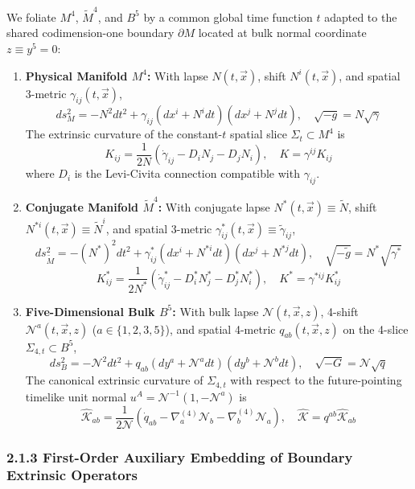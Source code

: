 \documentclass[aps,prd,onecolumn,superscriptaddress,nofootinbib,longbibliography,10pt]{revtex4-2}
\begin{document}
{{  We foliate \(M^4\), \(\tilde{M}^4\), and \(B^5\) by a common global time function \(t\) adapted to the shared codimension-one boundary \(\partial M\) located at bulk normal coordinate \(z \equiv y^5 = 0\):


  
\begin{enumerate}
    
\item \textbf{Physical Manifold \(M^4\):} With lapse \(N(t,\vec{x})\), shift \(N^i(t,\vec{x})\), and spatial 3-metric \(\gamma_{ij}(t,\vec{x})\),
    \[ ds_M^2 = -N^2 dt^2 + \gamma_{ij}(dx^i + N^i dt)(dx^j + N^j dt), \quad \sqrt{-g} = N\sqrt{\gamma} \]
    The extrinsic curvature of the constant-\(t\) spatial slice \(\Sigma_t \subset M^4\) is
    \[ K_{ij} = \frac{1}{2N}(\dot{\gamma}_{ij} - D_i N_j - D_j N_i), \quad K = \gamma^{ij}K_{ij} \]
    where \(D_i\) is the Levi-Civita connection compatible with \(\gamma_{ij}\).
    
\item \textbf{Conjugate Manifold \(\tilde{M}^4\):} With conjugate lapse \(N^*(t,\vec{x}) \equiv \tilde{N}\), shift \(N^{*i}(t,\vec{x}) \equiv \tilde{N}^i\), and spatial 3-metric \(\gamma^*_{ij}(t,\vec{x}) \equiv \tilde{\gamma}_{ij}\),
    \[ ds_{\tilde{M}}^2 = -(N^*)^2 dt^2 + \gamma^*_{ij}(dx^i + N^{*i}dt)(dx^j + N^{*j}dt), \quad \sqrt{-\tilde{g}} = N^*\sqrt{\gamma^*} \]
    \[ K^*_{ij} = \frac{1}{2N^*}(\dot{\gamma}^*_{ij} - D^*_i N^*_j - D^*_j N^*_i), \quad K^* = \gamma^{*ij}K^*_{ij} \]
    
\item \textbf{Five-Dimensional Bulk \(B^5\):} With bulk lapse \(\mathcal{N}(t,\vec{x},z)\), 4-shift \(\mathcal{N}^a(t,\vec{x},z)\) (\(a \in \{1,2,3,5\}\)), and spatial 4-metric \(q_{ab}(t,\vec{x},z)\) on the 4-slice \(\Sigma_{4,t} \subset B^5\),
    \[ ds_B^2 = -\mathcal{N}^2 dt^2 + q_{ab}(dy^a + \mathcal{N}^a dt)(dy^b + \mathcal{N}^b dt), \quad \sqrt{-G} = \mathcal{N}\sqrt{q} \]
    The canonical extrinsic curvature of \(\Sigma_{4,t}\) with respect to the future-pointing timelike unit normal \(u^A = \mathcal{N}^{-1}(1, -\mathcal{N}^a)\) is
    \[ \widehat{\mathcal{K}}_{ab} = \frac{1}{2\mathcal{N}}\left(\dot{q}_{ab} - \nabla^{(4)}_a \mathcal{N}_b - \nabla^{(4)}_b \mathcal{N}_a\right), \quad \widehat{\mathcal{K}} = q^{ab}\widehat{\mathcal{K}}_{ab} \]
  
\end{enumerate}


  
\subsubsection*{2.1.3 First-Order Auxiliary Embedding of Boundary Extrinsic Operators}

}}
\end{document}

